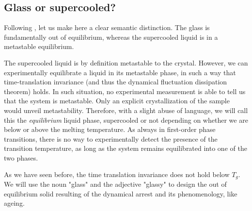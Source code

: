 
\subsection{Glass or supercooled?}
\label{sec:glass_or_sc}
Following \citet{cavagna2009supercooled}, let us make here a clear semantic distinction. The glass is fundamentally out of equilibrium, whereas the supercooled liquid is in a metastable equilibrium.

The supercooled liquid is by definition metastable to the crystal. However, we can experimentally equilibrate a liquid in its metastable phase, in such a way that time-translation invariance (and thus the dynamical fluctuation dissipation theorem) holds. In such situation, no experimental measurement is able to tell us that the system is metastable. Only an explicit crystallization of the sample would unveil metastability. Therefore, with a slight abuse of language, we will call this the \emph{equilibrium} liquid phase, supercooled or not depending on whether we are below or above the melting temperature. As always in first-order phase transitions, there is no way to experimentally detect the presence of the transition temperature, as long as the system remains equilibrated into one of the two phases.

As we have seen before, the time translation invariance does not hold below $T_g$. We will use the noun "glass" and the adjective "glassy" to design the out of equilibrium solid resulting of the dynamical arrest and its phenomenology, like ageing.

